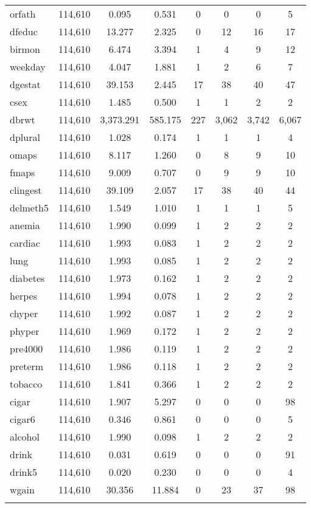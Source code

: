 \begin{longtable}{@{\extracolsep{5pt}}lccccccc}
orfath & 114,610 & 0.095 & 0.531 & 0 & 0 & 0 & 5 \\ 
dfeduc & 114,610 & 13.277 & 2.325 & 0 & 12 & 16 & 17 \\ 
birmon & 114,610 & 6.474 & 3.394 & 1 & 4 & 9 & 12 \\ 
weekday & 114,610 & 4.047 & 1.881 & 1 & 2 & 6 & 7 \\ 
dgestat & 114,610 & 39.153 & 2.445 & 17 & 38 & 40 & 47 \\ 
csex & 114,610 & 1.485 & 0.500 & 1 & 1 & 2 & 2 \\ 
dbrwt & 114,610 & 3,373.291 & 585.175 & 227 & 3,062 & 3,742 & 6,067 \\ 
dplural & 114,610 & 1.028 & 0.174 & 1 & 1 & 1 & 4 \\ 
omaps & 114,610 & 8.117 & 1.260 & 0 & 8 & 9 & 10 \\ 
fmaps & 114,610 & 9.009 & 0.707 & 0 & 9 & 9 & 10 \\ 
clingest & 114,610 & 39.109 & 2.057 & 17 & 38 & 40 & 44 \\ 
delmeth5 & 114,610 & 1.549 & 1.010 & 1 & 1 & 1 & 5 \\ 
anemia & 114,610 & 1.990 & 0.099 & 1 & 2 & 2 & 2 \\ 
cardiac & 114,610 & 1.993 & 0.083 & 1 & 2 & 2 & 2 \\ 
lung & 114,610 & 1.993 & 0.085 & 1 & 2 & 2 & 2 \\ 
diabetes & 114,610 & 1.973 & 0.162 & 1 & 2 & 2 & 2 \\ 
herpes & 114,610 & 1.994 & 0.078 & 1 & 2 & 2 & 2 \\ 
chyper & 114,610 & 1.992 & 0.087 & 1 & 2 & 2 & 2 \\ 
phyper & 114,610 & 1.969 & 0.172 & 1 & 2 & 2 & 2 \\ 
pre4000 & 114,610 & 1.986 & 0.119 & 1 & 2 & 2 & 2 \\ 
preterm & 114,610 & 1.986 & 0.118 & 1 & 2 & 2 & 2 \\ 
tobacco & 114,610 & 1.841 & 0.366 & 1 & 2 & 2 & 2 \\ 
cigar & 114,610 & 1.907 & 5.297 & 0 & 0 & 0 & 98 \\ 
cigar6 & 114,610 & 0.346 & 0.861 & 0 & 0 & 0 & 5 \\ 
alcohol & 114,610 & 1.990 & 0.098 & 1 & 2 & 2 & 2 \\ 
drink & 114,610 & 0.031 & 0.619 & 0 & 0 & 0 & 91 \\ 
drink5 & 114,610 & 0.020 & 0.230 & 0 & 0 & 0 & 4 \\ 
wgain & 114,610 & 30.356 & 11.884 & 0 & 23 & 37 & 98 \\ 
\hline \\[-1.8ex] 
\end{longtable} 

